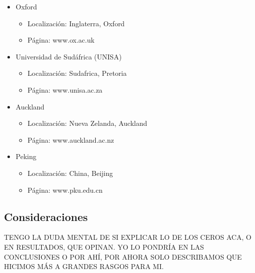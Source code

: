 \begin{itemize}
	\item Oxford
	
	\begin{itemize}
		\item Localización: Inglaterra, Oxford 
		\item Página: www.ox.ac.uk
	\end{itemize}

	\item Universidad de Sudáfrica (UNISA)
	
	\begin{itemize}
		\item Localización: Sudafrica, Pretoria
		\item Página: www.unisa.ac.za
	\end{itemize}
		 
	\item Auckland
	 
	\begin{itemize}
		\item Localización: Nueva Zelanda, Auckland 
		\item Página: www.auckland.ac.nz
	\end{itemize}

	\item Peking
	 
	\begin{itemize}
		\item Localización: China, Beijing 
		\item Página: www.pku.edu.cn
	\end{itemize}

\end{itemize}


\subsection{Consideraciones}

TENGO LA DUDA MENTAL DE SI EXPLICAR LO DE LOS CEROS ACA, O EN RESULTADOS, QUE OPINAN. 
YO LO PONDRÍA EN LAS CONCLUSIONES O POR AHÍ, POR AHORA SOLO DESCRIBAMOS QUE HICIMOS MÁS A GRANDES RASGOS PARA MI.